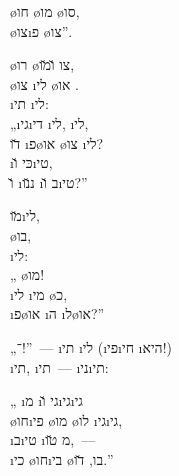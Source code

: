\begin{twocol}
\begin{stanza}
  \o{חו} \o{מו}  \o{סו},\\
  \o{צו}\i{פ} \o{צו}”.
\end{stanza}

\begin{stanza}
\o{רו}  \o{צו} \u{ו}\u{מו},\\
\o{צו}  \i{לי} \o{או} .\\
\i{תי} \i{לי}:\\
„\i{גי}\i{די} \i{לי}, \i{לי},\\
\u{דו} \i{פ}\o{או}  \o{צו} \i{לי}?\\
  \i{כּי} \u{ו}\i{טי},\\
\u{ו} \i{נ}\u{נו} \i{ב} \u{ו}\i{טי}?”
\end{stanza}

\begin{stanza}
 \u{מו}\i{לי},\\
 \o{בו},\\
  \i{לי}:\\
„ \o{מו}!\\
  \i{לי} \i{מי}  \o{כ},\\
  \i{פ}\o{או} \i{ה} \i{ל}\o{או}?”
\end{stanza}

\begin{stanza}
„־!”~— \i{תי} \i{לי} (\i{פי}\i{חי} \i{היא}!)\\
\i{תי}, \i{תי}~—  \i{ני}\i{תי}:
\end{stanza}

\begin{stanza}
„  \i{מ} \i{גי} \u{ו}\i{גי}\i{גי}\\
\o{חו}\i{פי} \o{מו} \o{לו} \i{גי}\i{גי},\\
 \i{ב}\i{טי}  \i{מ} \u{טו},~—\\
\i{כי}  \o{חו}\i{בי} \o{בו}, \u{דו}.”
\end{stanza}


\end{twocol}

